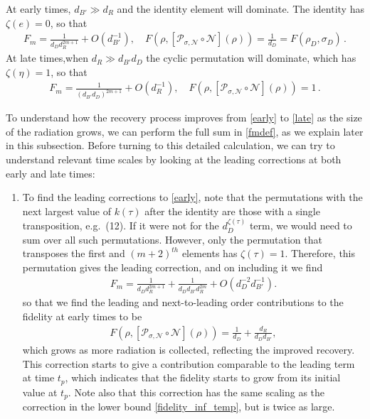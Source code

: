 \documentclass[a4paper,11pt]{article}
\begin{document}
\begin{enumerate}
At early times, $d_{B'} \gg d_R$ and the identity element will dominate. The identity has $\zeta(e) = 0$, so that 
\begin{align}
 F_m = \frac{1}{d_{D}d_R^{2m +1}} + O\left(d_{B'}^{-1}\right), \quad F(\rho, [\mathcal{P}_{\sigma, \mathcal{N}}\circ \mathcal{N}](\rho)) = \frac{1}{d_D} = F(\rho_D, \sigma_D) \, . \label{early}
\end{align}
At late times,when $d_R \gg d_{B'}d_D$ the cyclic permutation will dominate, which has $\zeta(\eta) = 1$, so that
\begin{align}
 F_m = \frac{1}{(d_{B'}d_D)^{2m +1}} + O\left( d_R^{-1}\right) , \quad F(\rho , [\mathcal{P}_{\sigma,\mathcal{N}}\circ \mathcal{N}](\rho)) =1 \, . \label{late}
\end{align}

To understand how the recovery process improves from \eqref{early} to \eqref{late} as the size of the radiation grows, we can perform the full sum in \eqref{fmdef}, as we explain later in this subsection. Before turning to this detailed calculation, we can try to understand relevant time scales by looking at the leading corrections at both early and late times: 
\begin{enumerate} 
\item To find the leading corrections to \eqref{early}, note that
 the permutations with the next largest value of $k(\tau)$ after the identity are those with a single transposition, e.g.~(12). If it were not for the $d_D^{\zeta(\tau)}$ term, we would need to sum over all such permutations. However, only the permutation that transposes the first and $(m+2)^{th}$ elements has $\zeta(\tau) = 1$. Therefore, this permutation gives the leading correction, and on including it we find
\begin{align}
 F_m = \frac{1}{d_{D}d_R^{2m +1}} + \frac{1}{d_{D}d_{B'}d_R ^{2m }} + O\left(d_D^{-2}d_{B'}^{-1}\right).
\end{align}
so that we find the leading and next-to-leading order contributions to the fidelity at early times to be
\begin{align}
 F(\rho , [\mathcal{P}_{\sigma,\mathcal{N}}\circ \mathcal{N}](\rho)) = \frac{1}{d_D} + \frac{d_R}{d_D d_{B'}}, \label{early_petz}
\end{align}
which grows as more radiation is collected, reflecting the improved recovery. This correction starts to give a contribution comparable to the leading term at time $t_{p}$, which indicates that the fidelity starts to grow from its initial value at $t_p$. Note also that this correction has the same scaling as the correction in the lower bound \eqref{fidelity_inf_temp}, but is twice as large. 


\end{enumerate}
\end{enumerate}
\end{document}

